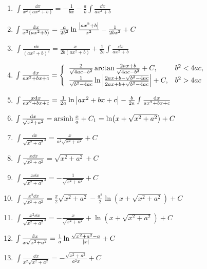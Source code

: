 \begin{enumerate}
\item \(\int \frac{\dd{x}}{x^2(ax^2+b)} = -\frac{1}{bx} - \frac{a}{b} \int \frac{\dd{x}}{ax^2+b}\)

\item \(\int \frac{\dd{x}}{x^3(ax^2+b)} = \frac{a}{2b^2} \ln\frac{\abs{ax^2+b}}{x^2} - \frac{1}{2bx^2} + C\)

\item \(\int \frac{\dd{x}}{(ax^2+b)^2} = \frac{x}{2b(ax^2+b)} + \frac{1}{2b} \int \frac{\dd{x}}{ax^2+b}\)

\item \(\int \frac{\dd{x}}{ax^2+bx+c} = \left\{ \begin{array}{ll}
\frac{2}{\sqrt{4ac-b^2}} \arctan\frac{2ax+b}{\sqrt{4ac-b^2}} + C, & b^2<4ac, \\
\frac{1}{\sqrt{b^2-4ac}} \ln\abs{\frac{2ax+b-\sqrt{b^2-4ac}}{2ax+b+\sqrt{b^2-4ac}}} + C, & b^2>4ac
\end{array} \right.\)

\item \(\int \frac{x \dd{x}}{ax^2+bx+c} = \frac{1}{2a} \ln\abs{ax^2+bx+c} - \frac{b}{2a} \int \frac{\dd{x}}{ax^2+bx+c}\)

\item \(\int \frac{\dd{x}}{\sqrt{x^2+a^2}} = \operatorname{arsinh}\frac{x}{a} + C_1
= \ln(x+\sqrt{x^2+a^2}) + C\)

\item \(\int \frac{\dd{x}}{\sqrt{x^2+a^2}^3} = \frac{x}{a^2 \sqrt{x^2+a^2}} + C\)

\item \(\int \frac{x \dd{x}}{\sqrt{x^2+a^2}} = \sqrt{x^2+a^2} + C\)

\item \(\int \frac{x \dd{x}}{\sqrt{x^2+a^2}^3} = -\frac{1}{\sqrt{x^2+a^2}} + C\)

\item \(\int \frac{x^2 \dd{x}}{\sqrt{x^2+a^2}} = \frac{x}{2}\sqrt{x^2+a^2} - \frac{a^2}{2} \ln(x+\sqrt{x^2+a^2}) + C\)

\item \(\int \frac{x^2 \dd{x}}{\sqrt{x^2+a^2}^3} = -\frac{x}{\sqrt{x^2+a^2}} + \ln(x+\sqrt{x^2+a^2}) + C\)

\item \(\int \frac{\dd{x}}{x\sqrt{x^2+a^2}} = \frac{1}{a} \ln\frac{\sqrt{x^2+a^2}-a}{\abs{x}} + C\)

\item \(\int \frac{\dd{x}}{x^2\sqrt{x^2+a^2}} = -\frac{\sqrt{x^2+a^2}}{a^2 x} + C\)


\end{enumerate}
